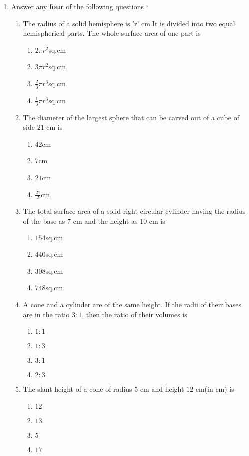 \begin{enumerate}
\item Answer any \textbf{four} of the following questions :
\begin{enumerate}[label=(\roman*)]

    \item The radius of a solid hemisphere is 'r' cm.It is divided into two equal hemispherical parts. The whole surface area of one part is
    \begin{enumerate} [label=(\Alph*)]
        \item $2\pi{r}^2$sq.cm
        \item $3\pi{r}^2$sq.cm
        \item $\frac{2}{3}\pi{r}^3$sq.cm
        \item $\frac{1}{3}\pi{r}^3$sq.cm

\end{enumerate} 

 
\item The diameter of the largest sphere that can be carved out
of a cube of side $21$ cm is
\begin{enumerate} [label=(\Alph*)]
        \item $42$cm
        \item $7$cm
        \item $21$cm
        \item $\frac{21}{2}$cm
\end{enumerate}
\item The total surface area of a solid right circular cylinder
having the radius of the base as $7$ cm and the height as
$10$ cm is
\begin{enumerate} [label=(\Alph*)]
        \item $154$sq.cm
        \item $440$sq.cm
        \item $308$sq.cm
        \item $748$sq.cm
\end{enumerate}
\item A cone and a cylinder are of the same height. If the radii
of their bases are in the ratio $3 : 1$, then the ratio of their
volumes is
\begin{enumerate} [label=(\Alph*)]
        \item $1:1$
        \item $1:3$
        \item $3:1$
        \item $2:3$
\end{enumerate}
\item The slant height of a cone of radius $5$ cm and height $12$ cm(in cm) is
\begin{enumerate} [label=(\Alph*)]
        \item $12$
        \item $13$
        \item $5$
        \item $17$
\end{enumerate}
\end{enumerate}
\end{enumerate}
